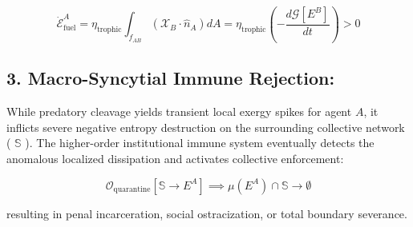 \documentclass[11pt,a4paper]{article}
\theoremstyle{definition}
\theoremstyle{remark}
\begin{document}
\begin{equation}
\dot{\mathcal{E}}_{\text{fuel}}^A = \eta_{\text{trophic}} \int_{f_{AB}} \left( \boldsymbol{\mathcal{X}}_B \cdot \hat{n}_A \right) dA = \eta_{\text{trophic}} \left( -\frac{d\mathcal{G}[E^B]}{dt} \right) > 0
\end{equation}


\subsection{3. Macro-Syncytial Immune Rejection:}
While predatory cleavage yields transient local exergy spikes for agent $A$, it inflicts severe negative entropy destruction on the surrounding collective network ( $\mathbb{S}$ ). The higher-order institutional immune system eventually detects the anomalous localized dissipation and activates collective enforcement:


\begin{equation}
\mathcal{O}_{\text{quarantine}}[\mathbb{S} \to E^A] \implies \mu(E^A) \cap \mathbb{S} \longrightarrow \emptyset
\end{equation}


resulting in penal incarceration, social ostracization, or total boundary severance.
\end{document}
